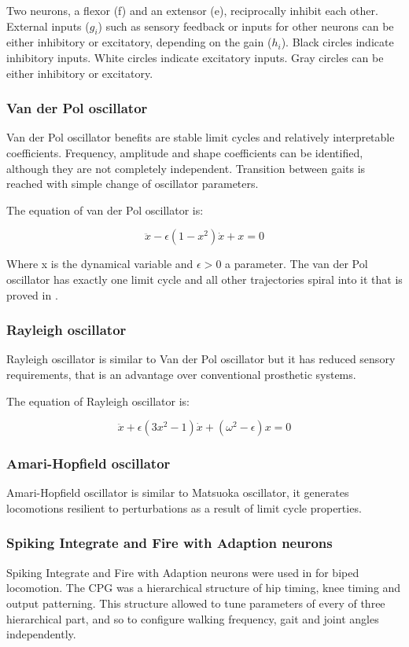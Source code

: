 \documentclass[11pt,a4paper]{report}
\begin{document}
				Two neurons, a flexor (f) and an extensor (e), reciprocally inhibit each other. External inputs ($g_i$) such as sensory feedback or inputs for other neurons can be either inhibitory or excitatory, depending on the gain ($h_i$). Black circles indicate inhibitory inputs. White circles indicate excitatory inputs. Gray circles can be either inhibitory or excitatory.
			\subsubsection{Van der Pol oscillator}
				Van der Pol oscillator benefits are stable limit cycles and relatively interpretable coefficients. Frequency, amplitude and shape coefficients can be identified, although they are not completely independent. Transition between gaits is reached with simple change of oscillator parameters.
				
				The equation of van der Pol oscillator is:
				
				\begin{equation}\label{eq:Pol1}
					\ddot{x} - \epsilon(1 - x^2)\dot{x} + x = 0
				\end{equation}
				
				Where x is the dynamical variable and $\epsilon > 0$ a parameter.
				The van der Pol oscillator has exactly one limit cycle and all other trajectories spiral into it that is proved in \cite{kanamaru2007van}.
			\subsubsection{Rayleigh oscillator}
				Rayleigh oscillator is similar to Van der Pol oscillator but it has reduced sensory requirements, that is an advantage over conventional prosthetic systems.
				
				The equation of Rayleigh oscillator is:
				
				\begin{equation}\label{eq:Rel1}
					\ddot{x} + \epsilon(3x^2 - 1)\dot{x} + (\omega^2 - \epsilon)x = 0
				\end{equation}
			\subsubsection{Amari-Hopfield oscillator}
				Amari-Hopfield oscillator is similar to Matsuoka oscillator, it generates locomotions resilient to perturbations as a result of limit cycle properties.
			\subsubsection{Spiking Integrate and Fire with Adaption neurons}
				Spiking Integrate and Fire with Adaption neurons were used in \cite{russell2007configuring} for biped locomotion. The CPG was a hierarchical structure of hip timing, knee timing and output patterning. This structure allowed to tune parameters of every of three hierarchical part, and so to configure walking frequency, gait and joint angles independently.
\end{document}
